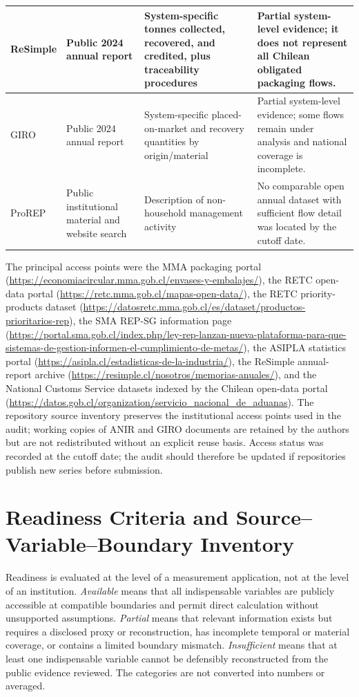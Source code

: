 \documentclass[review,10pt]{elsarticle}
\begin{document}
\begin{longtable}{|L{2.6cm}|L{3.2cm}|L{4.5cm}|L{4.7cm}|}
\hline
ReSimple & Public 2024 annual report & System-specific tonnes collected, recovered, and credited, plus traceability procedures & Partial system-level evidence; it does not represent all Chilean obligated packaging flows. \\
\hline
GIRO & Public 2024 annual report & System-specific placed-on-market and recovery quantities by origin/material & Partial system-level evidence; some flows remain under analysis and national coverage is incomplete. \\
\hline
ProREP & Public institutional material and website search & Description of non-household management activity & No comparable open annual dataset with sufficient flow detail was located by the cutoff date. \\
\hline
\end{longtable}

The principal access points were the MMA packaging portal (\url{https://economiacircular.mma.gob.cl/envases-y-embalajes/}), the RETC open-data portal (\url{https://retc.mma.gob.cl/mapas-open-data/}), the RETC priority-products dataset (\url{https://datosretc.mma.gob.cl/es/dataset/productos-prioritarios-rep}), the SMA REP-SG information page (\url{https://portal.sma.gob.cl/index.php/ley-rep-lanzan-nueva-plataforma-para-que-sistemas-de-gestion-informen-el-cumplimiento-de-metas/}), the ASIPLA statistics portal (\url{https://asipla.cl/estadisticas-de-la-industria/}), the ReSimple annual-report archive (\url{https://resimple.cl/nosotros/memorias-anuales/}), and the National Customs Service datasets indexed by the Chilean open-data portal (\url{https://datos.gob.cl/organization/servicio_nacional_de_aduanas}). The repository source inventory preserves the institutional access points used in the audit; working copies of ANIR and GIRO documents are retained by the authors but are not redistributed without an explicit reuse basis. Access status was recorded at the cutoff date; the audit should therefore be updated if repositories publish new series before submission.

\section{Readiness Criteria and Source--Variable--Boundary Inventory}

Readiness is evaluated at the level of a measurement application, not at the level of an institution. \textit{Available} means that all indispensable variables are publicly accessible at compatible boundaries and permit direct calculation without unsupported assumptions. \textit{Partial} means that relevant information exists but requires a disclosed proxy or reconstruction, has incomplete temporal or material coverage, or contains a limited boundary mismatch. \textit{Insufficient} means that at least one indispensable variable cannot be defensibly reconstructed from the public evidence reviewed. The categories are not converted into numbers or averaged.
\end{document}
